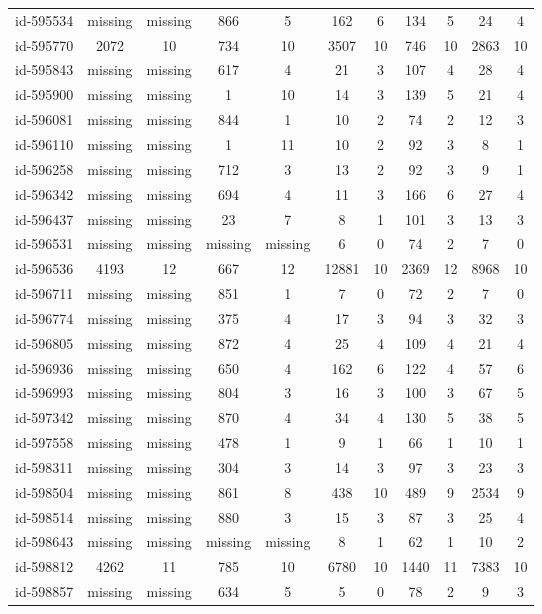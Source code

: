 \begin{tabular}{ccccccccccc}
id-595534 & missing & missing & 866 & 5 & 162 & 6 & 134 & 5 & 24 & 4\\
id-595770 & 2072 & 10 & 734 & 10 & 3507 & 10 & 746 & 10 & 2863 & 10\\
id-595843 & missing & missing & 617 & 4 & 21 & 3 & 107 & 4 & 28 & 4\\
id-595900 & missing & missing & 1 & 10 & 14 & 3 & 139 & 5 & 21 & 4\\
id-596081 & missing & missing & 844 & 1 & 10 & 2 & 74 & 2 & 12 & 3\\
id-596110 & missing & missing & 1 & 11 & 10 & 2 & 92 & 3 & 8 & 1\\
id-596258 & missing & missing & 712 & 3 & 13 & 2 & 92 & 3 & 9 & 1\\
id-596342 & missing & missing & 694 & 4 & 11 & 3 & 166 & 6 & 27 & 4\\
id-596437 & missing & missing & 23 & 7 & 8 & 1 & 101 & 3 & 13 & 3\\
id-596531 & missing & missing & missing & missing & 6 & 0 & 74 & 2 & 7 & 0\\
id-596536 & 4193 & 12 & 667 & 12 & 12881 & 10 & 2369 & 12 & 8968 & 10\\
id-596711 & missing & missing & 851 & 1 & 7 & 0 & 72 & 2 & 7 & 0\\
id-596774 & missing & missing & 375 & 4 & 17 & 3 & 94 & 3 & 32 & 3\\
id-596805 & missing & missing & 872 & 4 & 25 & 4 & 109 & 4 & 21 & 4\\
id-596936 & missing & missing & 650 & 4 & 162 & 6 & 122 & 4 & 57 & 6\\
id-596993 & missing & missing & 804 & 3 & 16 & 3 & 100 & 3 & 67 & 5\\
id-597342 & missing & missing & 870 & 4 & 34 & 4 & 130 & 5 & 38 & 5\\
id-597558 & missing & missing & 478 & 1 & 9 & 1 & 66 & 1 & 10 & 1\\
id-598311 & missing & missing & 304 & 3 & 14 & 3 & 97 & 3 & 23 & 3\\
id-598504 & missing & missing & 861 & 8 & 438 & 10 & 489 & 9 & 2534 & 9\\
id-598514 & missing & missing & 880 & 3 & 15 & 3 & 87 & 3 & 25 & 4\\
id-598643 & missing & missing & missing & missing & 8 & 1 & 62 & 1 & 10 & 2\\
id-598812 & 4262 & 11 & 785 & 10 & 6780 & 10 & 1440 & 11 & 7383 & 10\\
id-598857 & missing & missing & 634 & 5 & 5 & 0 & 78 & 2 & 9 & 3\\

\end{tabular}
